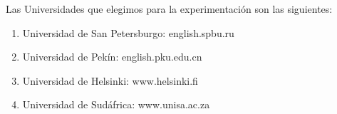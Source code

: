 Las Universidades que elegimos para la experimentación son las siguientes:

\begin{enumerate}
	\item Universidad de San Petersburgo: english.spbu.ru
	\item Universidad de Pekín: english.pku.edu.cn
	\item Universidad de Helsinki: www.helsinki.fi
	\item Universidad de Sudáfrica: www.unisa.ac.za
\end{enumerate}